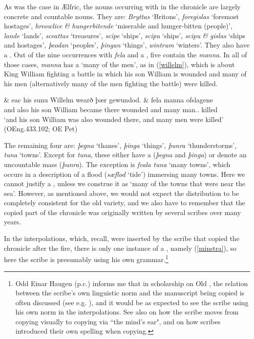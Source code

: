 \documentclass[output=paper,colorlinks,citecolor=brown]{langscibook}
\begin{document}
As was the case in Ælfric, the nouns occurring with  in the chronicle are largely concrete and countable nouns. They are: \textit{Bryttas} ‘Britons’, \textit{foregislas} ‘foremost hostages’, \textit{hreowlice} \textit{\&} \textit{hungerbitende} ‘miserable and hunger-bitten (people)’, \textit{lande} ‘lands’, \textit{sceattas} ‘treasures’, \textit{scipe} ‘ships’, \textit{scipu} ‘ships’, \textit{scipu} \textit{\&} \textit{gislas} ‘ships and hostages’, \textit{þeodan} ‘peoples’, \textit{þingan} ‘things’, \textit{wintrum} ‘winters’. They also have a . Out of the nine occurrences with \textit{fela} and a , five contain the  \textit{manna}. In all of those cases, \textit{manna} has a  ‘many of the men’, as in (\ref{willelm}), which is about King William fighting a battle in which his son William is wounded and many of his men (alternatively many of the men fighting the battle) were killed. 

\ea\label{willelm}
\gll \& eac his sunu Willelm wearð þær gewundod. \& fela manna ofslagene\\
and also his son William became there wounded and many man.\GEN.\PL{} killed\\
\glt ‘and his son William was also wounded there, and many men were killed’ (OEng.433.102; OE Pet)
\z

The remaining four are: \textit{þegna} ‘thanes’, \textit{þinga} ‘things’, \textit{þunra} ‘thunderstorms’, \textit{tuna} ‘towns’. Except for \textit{tuna}, these either have a  (\textit{þegna} and \textit{þinga}) or denote an uncountable mass (\textit{þunra}). The exception is \textit{feala tuna} ‘many towns’, which occurs in a description of a flood (\textit{sæflod} `tide') immersing many towns. Here we cannot justify a , unless we construe it as `many of the towns that were near the sea'. However, as mentioned above, we would not expect the distribution to be completely consistent for the old variety, and we also have to remember that the copied part of the chronicle was originally written by several scribes over many years. 

In the interpolations, which, recall, were inserted by the scribe that copied the chronicle after the fire, there is only one instance of a , namely (\ref{minstra}), so here the scribe is presumably using his own grammar.\footnote{Odd Einar Haugen (p.c.) informs me that in scholarship on Old , the relation between the scribe’s own linguistic norm and the manuscript being copied is often discussed (see e.g. \cite{Maartensson13}), and it would be as expected to see the scribe using his own norm in the interpolations. See also \citet[15, Section 3.3.2]{BenskinLaing86} on how the scribe moves from copying visually to copying via ``the mind's ear", and \citet[500--501]{Thaisen2014} on how scribes introduced their own spelling when copying.}
\end{document}
